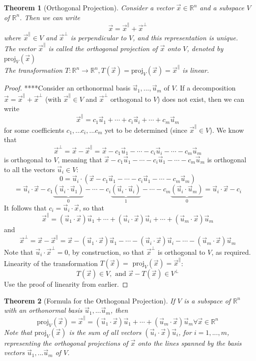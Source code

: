 \documentclass[10pt]{report}
\newtheorem{thm2}{Theorem}[section]
\begin{document}
\begin{thm2}[Orthogonal Projection]
Consider a vector $\vec{x}\in \mathbb{R}^n$ and a subspace $V$ of $\mathbb{R}^n$. Then we can write
$$\vec{x}=\vec{x}^\parallel + \vec{x}^\perp$$
where $\vec{x}^\parallel \in V$ and $\vec{x}^\perp$ is perpendicular to $V$, and this representation is unique. The vector $\vec{x}^\parallel$ is called the orthogonal projection of $\vec{x}$ onto $V$, denoted by $\text{proj}_V(\vec{x})$\\
The transformation $T:\mathbb{R}^n \to \mathbb{R}^n, T(\vec{x})=\text{proj}_V(\vec{x})= \vec{x}^\parallel$ is linear.
\end{thm2}
\begin{proof}
****Consider an orthonormal basis $\vec{u}_1,...,\vec{u}_m$ of $V$. If a decomposition $\vec{x}=\vec{x}^\parallel + \vec{x}^\perp$ (with $\vec{x}^\parallel \in V$ and $\vec{x}^\perp$ orthogonal to $V$) does not exist, then we can write
$$\vec{x}^\parallel = c_1\vec{u}_1 + \cdots + c_i\vec{u}_i + \cdots + c_m\vec{u}_m$$
for some coefficients $c_1,...c_i,... c_m$ yet to be determined (since $\vec{x}^\parallel \in V$). We know that $$\vec{x}^\perp = \vec{x} - \vec{x}^\parallel = \vec{x} - c_1\vec{u}_1 - \cdots - c_i\vec{u}_i - \cdots - c_m\vec{u}_m$$
is orthogonal to $V$, meaning that $\vec{x} - c_1\vec{u}_1 - \cdots - c_i\vec{u}_1 - \cdots - c_m\vec{u}_m$ is orthogonal to all the vectors $\vec{u}_i \in V$:
$$0 = \vec{u}_i\cdot (\vec{x} - c_1\vec{u}_1 - \cdots -c_i\vec{u}_1 - \cdots - c_m\vec{u}_m)$$
$$= \vec{u}_i \cdot \vec{x} - c_1\underbrace{(\vec{u}_i \cdot \vec{u}_1)}_0 - \cdots - c_i\underbrace{(\vec{u}_i \cdot \vec{u}_i)}_1 - \cdots - c_m\underbrace{(\vec{u}_i \cdot \vec{u}_m)}_0 = \vec{u}_i \cdot \vec{x} - c_i$$
It follows that $c_i =\vec{u}_i \cdot \vec{x}$, so that
$$\vec{x}^\parallel = (\vec{u}_1\cdot \vec{x})\vec{u}_1 + \cdots + (\vec{u}_i \cdot \vec{x})\vec{u}_i + \cdots + (\vec{u}_m \cdot \vec{x}) \vec{u}_m$$
and
$$\vec{x}^\perp = \vec{x} - \vec{x}^\parallel = \vec{x}- (\vec{u}_1\cdot \vec{x})\vec{u}_1 - \cdots - (\vec{u}_i \cdot \vec{x})\vec{u}_i - \cdots - (\vec{u}_m \cdot \vec{x})\vec{u}_m$$
Note that $\vec{u}_i \cdot \vec{x}^\perp = 0$, by construction, so that $\vec{x}^\perp$ is orthogonal to $V$, as required.
\\Linearity of the transformation $T(\vec{x}) = \text{ proj}_V(\vec{x}) = \vec{x}^\parallel$:
$$T(\vec{x})\in V, \text{ and } \vec{x} - T(\vec{x}) \in V^\perp$$
Use the proof of linearity from earlier.
\end{proof}
\begin{thm2}[Formula for the Orthogonal Projection]
If $V$ is a subspace of $\mathbb{R}^n$ with an orthonormal basis $\vec{u}_1,...\vec{u}_m$, then
$$\text{proj}_V(\vec{x}) = \vec{x}^\parallel = (\vec{u}_1 \cdot \vec{x})\vec{u}_1 + \cdots + (\vec{u}_m \cdot \vec{x})\vec{u}_m \forall \vec{x} \in \mathbb{R}^n$$
Note that $\text{proj}_V(\vec{x})$ is the sum of all vectors $(\vec{u}_i \cdot \vec{x})\vec{u}_i$, for $i= 1, ...,m$, representing the orthogonal projections of $\vec{x}$ onto the lines spanned by the basis vectors $\vec{u}_1,...\vec{u}_m$ of $V$.
\end{thm2}
\end{document}
